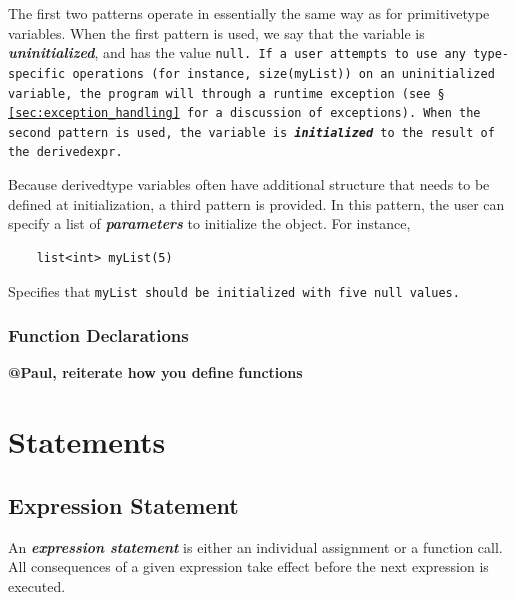 \documentclass{article}
\begin{document}
The first two patterns operate in essentially the same way as for primitive­type
variables. When the first pattern is used, we say that the variable is
\textbf{\emph{uninitialized}}, and has the value \tt null\rm. If a user attempts to
use any type­specific operations (for instance, \tt size(myList)) \rm on an
uninitialized variable, the program will through a run­time exception (see \S
\ref{sec:exception_handling} for a discussion of exceptions). When the second
pattern is used, the variable is \textbf{\emph{initialized}} to the result of the
\tt derived­expr\rm.

Because derived­type variables often have additional structure that needs to be
defined at initialization, a third pattern is provided. In this pattern, the user
can specify a list of \textbf{\emph{parameters}} to initialize the object. For
instance,

\begin{verbatim}
    list<int> myList(5)
\end{verbatim}

Specifies that \tt myList \rm should be initialized with five \tt null \rm values.


\subsubsection{Function Declarations} %
\label{ssub:function_declarations}

\textbf{@Paul, reiterate how you define functions}




\section{Statements} %
\label{sec:statements}

\subsection{Expression Statement} %
\label{sub:expression_statement}

An \textbf{\emph{expression statement}} is either an individual assignment or a function call. All consequences of a given
expression take effect before the next expression is executed.
\end{document}
